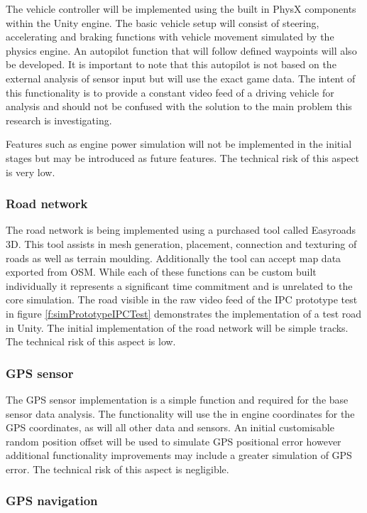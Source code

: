 \documentclass[]{aiaa-tc}%
\begin{document}
The vehicle controller will be implemented using the built in PhysX components within the Unity engine. The basic vehicle setup will consist of steering, accelerating and braking functions with vehicle movement simulated by the physics engine. An autopilot function that will follow defined waypoints will also be developed. It is important to note that this autopilot is not based on the external analysis of sensor input but will use the exact game data. The intent of this functionality is to provide a constant video feed of a driving vehicle for analysis and should not be confused with the solution to the main problem this research is investigating.

Features such as engine power simulation will not be implemented in the initial stages but may be introduced as future features. The technical risk of this aspect is very low.

\subsubsection{Road network}

The road network is being implemented using a purchased tool called Easyroads 3D. This tool assists in mesh generation, placement, connection and texturing of roads as well as terrain moulding. Additionally the tool can accept map data exported from OSM. While each of these functions can be custom built individually it represents a significant time commitment and is unrelated to the core simulation. The road visible in the raw video feed of the IPC prototype test in figure \ref{f:simPrototypeIPCTest} demonstrates the implementation of a test road in Unity. The initial implementation of the road network will be simple tracks. The technical risk of this aspect is low.

\subsubsection{GPS sensor}

The GPS sensor implementation is a simple function and required for the base sensor data analysis. The functionality will use the in engine coordinates for the GPS coordinates, as will all other data and sensors. An initial customisable random position offset will be used to simulate GPS positional error however additional functionality improvements may include a greater simulation of GPS error. The technical risk of this aspect is negligible.

\subsubsection{GPS navigation}
\end{document}
